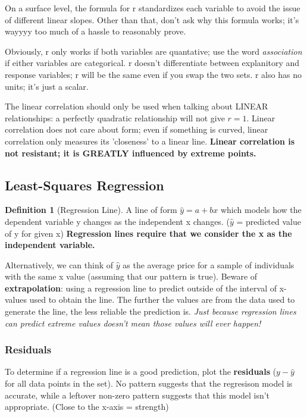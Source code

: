 \documentclass[12pt, a4paper]{article}
\theoremstyle{definition}
\newtheorem{definition}{Definition}
\begin{document}
On a surface level, the formula for r standardizes each variable to avoid the issue of different linear slopes.
Other than that, don't ask why this formula works; it's wayyyy too much of a hassle to reasonably prove.

Obviously, r only works if both variables are quantative; use the word \textit{association} if either variables are categorical.
r doesn't differentiate between explanitory and response variables; r will be the same even if you swap the two sets.
r also has no units; it's just a scalar.

The linear correlation should only be used when talking about LINEAR relationships: a perfectly quadratic relationship will not give $r = 1$.
Linear correlation does not care about form; even if something is curved, linear correlation only measures its 'closeness' to a linear line.
\textbf{Linear correlation is not resistant; it is GREATLY influenced by extreme points.}

\subsection{Least-Squares Regression}

\begin{definition}[Regression Line]
    A line of form $\hat{y} = a + bx$ which models how the dependent variable y changes as the independent x changes.
    ($\hat{y}$ = predicted value of y for given x)
    \textbf{Regression lines require that we consider the x as the independent variable.}
\end{definition}

Alternatively, we can think of $\hat{y}$ as the average price for a sample of individuals with the same x value (assuming that our pattern is true).
Beware of \textbf{extrapolation}: using a regression line to predict outside of the interval of x-values used to obtain the line.
The further the values are from the data used to generate the line, the less reliable the prediction is.
\textit{Just because regression lines can predict extreme values doesn't mean those values will ever happen!}

\subsubsection{Residuals}
To determine if a regression line is a good prediction, plot the \textbf{residuals} ($y - \hat{y}$ for all data points in the set).
No pattern suggests that the regresison model is accurate, while a leftover non-zero pattern suggests that this model isn't appropriate. (Close to the x-axis = strength)
\end{document}
